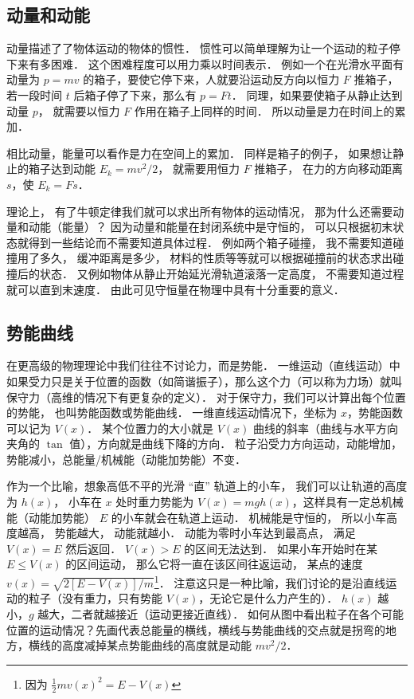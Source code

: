 

\subsection{动量和动能}
动量描述了了物体运动的物体的惯性． 惯性可以简单理解为让一个运动的粒子停下来有多困难． 这个困难程度可以用力乘以时间表示． 例如一个在光滑水平面有动量为 $p = mv$ 的箱子，要使它停下来，人就要沿运动反方向以恒力 $F$ 推箱子， 若一段时间 $t$ 后箱子停了下来，那么有 $p = Ft$．%
同理，如果要使箱子从静止达到动量 $p$， 就需要以恒力 $F$ 作用在箱子上同样的时间． 所以动量是力在时间上的累加．

相比动量，能量可以看作是力在空间上的累加． 同样是箱子的例子， 如果想让静止的箱子达到动能 $E_k = mv^2/2$， 就需要用恒力 $F$ 推箱子， 在力的方向移动距离 $s$，使 $E_k = Fs$．

理论上， 有了牛顿定律我们就可以求出所有物体的运动情况， 那为什么还需要动量和动能（能量）？ 因为动量和能量在封闭系统中是守恒的， 可以只根据初末状态就得到一些结论而不需要知道具体过程． 例如两个箱子碰撞， 我不需要知道碰撞用了多久， 缓冲距离是多少， 材料的性质等等就可以根据碰撞前的状态求出碰撞后的状态． 又例如物体从静止开始延光滑轨道滚落一定高度， 不需要知道过程就可以直到末速度． 由此可见守恒量在物理中具有十分重要的意义．

\subsection{势能曲线}
在更高级的物理理论中我们往往不讨论力，而是势能． 一维运动（直线运动）中如果受力只是关于位置的函数（如简谐振子），那么这个力（可以称为力场）就叫保守力（高维的情况下有更复杂的定义）． 对于保守力，我们可以计算出每个位置的势能， 也叫势能函数或势能曲线． 一维直线运动情况下，坐标为 $x$，势能函数可以记为 $V(x)$． 某个位置力的大小就是 $V(x)$ 曲线的斜率（曲线与水平方向夹角的 $\tan$ 值），方向就是曲线下降的方向． 粒子沿受力方向运动，动能增加，势能减小，总能量/机械能（动能加势能）不变．

作为一个比喻，想象高低不平的光滑 “直” 轨道上的小车， 我们可以让轨道的高度为 $h(x)$， 小车在 $x$ 处时重力势能为 $V(x) = mgh(x)$，这样具有一定总机械能（动能加势能） $E$ 的小车就会在轨道上运动． 机械能是守恒的， 所以小车高度越高， 势能越大， 动能就越小． 动能为零时小车达到最高点， 满足 $V(x) = E$ 然后返回． $V(x) > E$ 的区间无法达到． 如果小车开始时在某 $E \leq V(x)$ 的区间运动， 那么它将一直在该区间往返运动， 某点的速度 $v(x) = \sqrt{2[E - V(x)]/m}$\footnote{因为 $\frac{1}{2}mv(x)^2 = E - V(x)$}． 注意这只是一种比喻，我们讨论的是沿直线运动的粒子（没有重力，只有势能 $V(x)$，无论它是什么力产生的）． $h(x)$ 越小，$g$ 越大，二者就越接近（运动更接近直线）． 如何从图中看出粒子在各个可能位置的运动情况？先画代表总能量的横线，横线与势能曲线的交点就是拐弯的地方，横线的高度减掉某点势能曲线的高度就是动能 $mv^2/2$．

